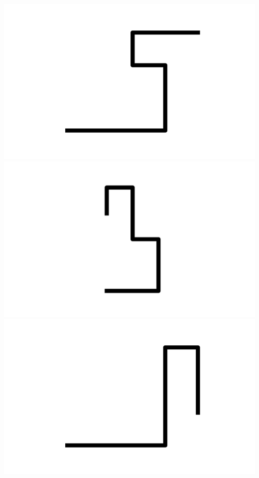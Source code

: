 \documentclass[]{report}
\begin{document}
\includegraphics[scale=.1]{pictures/21/state_cluster_shapes_232.pdf} 
\includegraphics[scale=.1]{pictures/21/state_cluster_shapes_233.pdf} 
\includegraphics[scale=.1]{pictures/21/state_cluster_shapes_234.pdf} 
\end{document}
